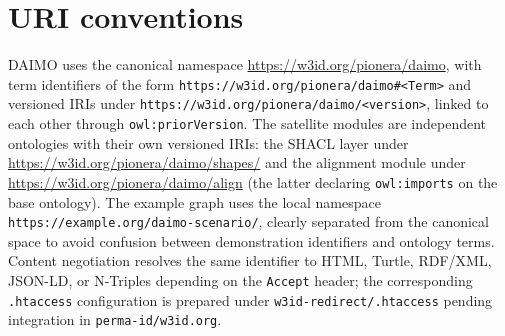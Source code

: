 \documentclass[11pt,a4paper]{article}
\newcommand{\code}[1]{\texttt{#1}}
\begin{document}
\section{URI conventions}\label{app:uris}

DAIMO uses the canonical namespace \url{https://w3id.org/pionera/daimo}, with term identifiers of the form \code{https://w3id.org/pionera/daimo\#<Term>} and versioned IRIs under \code{https://w3id.org/pionera/daimo/<version>}, linked to each other through \code{owl:priorVersion}. The satellite modules are independent ontologies with their own versioned IRIs: the SHACL layer under \url{https://w3id.org/pionera/daimo/shapes/} and the alignment module under \url{https://w3id.org/pionera/daimo/align} (the latter declaring \code{owl:imports} on the base ontology). The example graph uses the local namespace \code{https://example.org/daimo-scenario/}, clearly separated from the canonical space to avoid confusion between demonstration identifiers and ontology terms. Content negotiation resolves the same identifier to HTML, Turtle, RDF/XML, JSON-LD, or N-Triples depending on the \code{Accept} header; the corresponding \code{.htaccess} configuration is prepared under \code{w3id-redirect/.htaccess} pending integration in \code{perma-id/w3id.org}.
\end{document}
